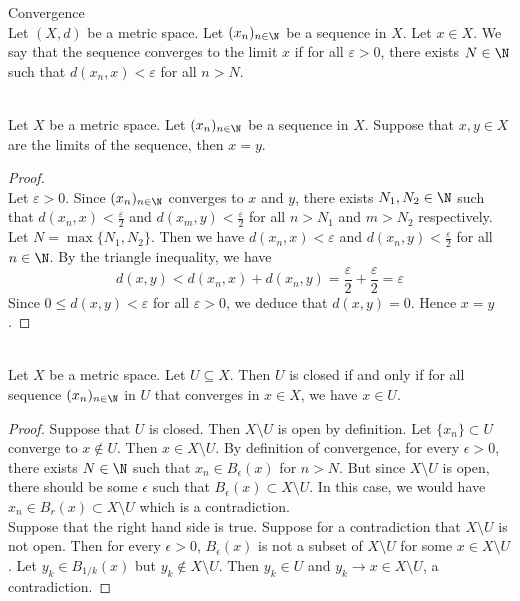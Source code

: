 \documentclass[a4paper]{article}
\begin{document}
\begin{defn}{Convergence}{}\\
Let $(X,d)$ be a metric space. Let $(x_n)_{n\in\N}$ be a sequence in $X$. Let $x\in X$. We say that the sequence converges to the limit $x$ if for all $\varepsilon>0$, there exists $N\in\N$ such that $d(x_n,x)<\varepsilon$ for all $n>N$. 
\end{defn}

\begin{lmm}{}{}\\
Let $X$ be a metric space. Let $(x_n)_{n\in\N}$ be a sequence in $X$. Suppose that $x,y\in X$ are the limits of the sequence, then $x=y$. 
\begin{proof}\\
Let $\varepsilon>0$. Since $(x_n)_{n\in\N}$ converges to $x$ and $y$, there exists $N_1,N_2\in\N$ such that $d(x_n,x)<\frac{\varepsilon}{2}$ and $d(x_m,y)<\frac{\varepsilon}{2}$ for all $n>N_1$ and $m>N_2$ respectively. Let $N=\max\{N_1,N_2\}$. Then we have $d(x_n,x)<\varepsilon$ and $d(x_n,y)<\frac{\varepsilon}{2}$ for all $n\in\N$. By the triangle inequality, we have $$d(x,y)<d(x_n,x)+d(x_n,y)=\frac{\varepsilon}{2}+\frac{\varepsilon}{2}=\varepsilon$$ Since $0\leq d(x,y)<\varepsilon$ for all $\varepsilon>0$, we deduce that $d(x,y)=0$. Hence $x=y$. 
\end{proof}
\end{lmm}

\begin{prp}{}{}\\
Let $X$ be a metric space. Let $U\subseteq X$. Then $U$ is closed if and only if for all sequence $(x_n)_{n\in\N}$ in $U$ that converges in $x\in X$, we have $x\in U$. 
\begin{proof} Suppose that $U$ is closed. Then $X\setminus U$ is open by definition. Let $\{x_n\}\subset U$ converge to $x\notin U$. Then $x\in X\setminus U$. By definition of convergence, for every $\epsilon>0$, there exists $N\in\N$ such that $x_n\in B_\epsilon(x)$ for $n>N$. But since $X\setminus U$ is open, there should be some $\epsilon$ such that $B_\epsilon(x)\subset X\setminus U$. In this case, we would have $x_n\in B_r(x)\subset X\setminus U$ which is a contradiction. \\
Suppose that the right hand side is true. Suppose for a contradiction that $X\setminus U$ is not open. Then for every $\epsilon>0$, $B_\epsilon(x)$ is not a subset of $X\setminus U$ for some $x\in X\setminus U$. Let $y_k\in B_{1/k}(x)$ but $y_k\notin X\setminus U$. Then $y_k\in U$ and $y_k\to x\in X\setminus U$, a contradiction. 
\end{proof}
\end{prp}
\end{document}
